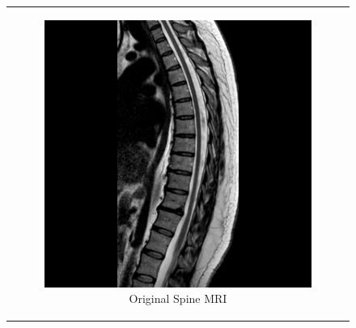 \documentclass[hidelinks,12pt]{article}
\begin{document}
\begin{figure}[!h]
\begin{tabular}{c}
\begin{subfigure}[h]{0.3\textwidth}
					\includegraphics[width=\textwidth]{figures/spine_mri/original.jpg}
					\caption{Original Spine MRI}
				\end{subfigure}
			\end{tabular}
		\caption{}
	\end{figure}
	
\end{document}

